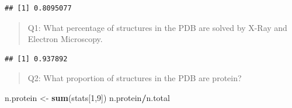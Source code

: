 \documentclass[
]{article}
\newenvironment{Shaded}{\begin{snugshade}}{\end{snugshade}}
\newcommand{\AttributeTok}[1]{\textcolor[rgb]{0.13,0.29,0.53}{#1}}
\newcommand{\CommentTok}[1]{\textcolor[rgb]{0.56,0.35,0.01}{\textit{#1}}}
\newcommand{\DecValTok}[1]{\textcolor[rgb]{0.00,0.00,0.81}{#1}}
\newcommand{\FunctionTok}[1]{\textcolor[rgb]{0.13,0.29,0.53}{\textbf{#1}}}
\newcommand{\NormalTok}[1]{#1}
\newcommand{\OtherTok}[1]{\textcolor[rgb]{0.56,0.35,0.01}{#1}}
\newcommand{\SpecialCharTok}[1]{\textcolor[rgb]{0.81,0.36,0.00}{\textbf{#1}}}
\newcommand{\StringTok}[1]{\textcolor[rgb]{0.31,0.60,0.02}{#1}}
\begin{document}
\begin{Shaded}
\end{Shaded}

\begin{verbatim}
## [1] 0.8095077
\end{verbatim}

\begin{quote}
Q1: What percentage of structures in the PDB are solved by X-Ray and
Electron Microscopy.
\end{quote}

\begin{Shaded}
\end{Shaded}

\begin{verbatim}
## [1] 0.937892
\end{verbatim}

\begin{quote}
Q2: What proportion of structures in the PDB are protein?
\end{quote}

\begin{Shaded}
\begin{Highlighting}[]
\NormalTok{n.protein }\OtherTok{\textless{}{-}} \FunctionTok{sum}\NormalTok{(stats[}\DecValTok{1}\NormalTok{,}\DecValTok{9}\NormalTok{])}
\NormalTok{n.protein}\SpecialCharTok{/}\NormalTok{n.total}
\end{Highlighting}
\end{Shaded}
\end{document}
